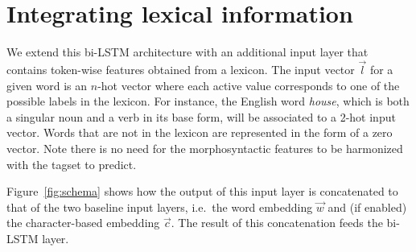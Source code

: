 \documentclass[11pt,a4paper]{article}
\begin{document}
\section{Integrating lexical information}

We extend this bi-LSTM architecture with an additional input layer that contains token-wise features obtained from a
lexicon. The input vector $\vec{l}$ for a given word is an $n$-hot vector where each active value corresponds to one of
the possible labels in the lexicon. For instance, the English word \textit{house}, which is both a singular noun and a
verb in its base form, will be associated to a 2-hot input vector. Words that are not in the lexicon are represented in
the form of a zero vector. Note there is no need for the morphosyntactic features to be harmonized with the tagset to
predict.

Figure~\ref{fig:schema} shows how the output of this input layer is concatenated to that of the two baseline input
layers, i.e.~the word embedding $\vec{w}$ and (if enabled) the character-based embedding $\vec{c}$. The result of this
concatenation feeds the bi-LSTM layer.

\end{document}
